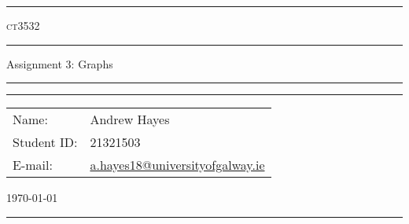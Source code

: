 \documentclass[a4paper,11pt]{article}
\author{Andrew Hayes}
\begin{document}
\begin{titlepage}
    \begin{center}
        \hrule
        \vspace*{0.6cm}
        \Huge \textsc{ct3532}
        \vspace*{0.6cm}
        \hrule
        \LARGE
       \vspace{0.5cm}
       Assignment 3: Graphs
       \vspace{0.5cm}
       \hrule

       \footnotesize
       \vfill
            \centering
       \vfill

       \hrule
        \begin{minipage}{0.495\textwidth} 
            \vspace{0.4em}
            \raggedright
            \normalsize 
            \begin{tabular}{@{}l l}
                Name: & Andrew Hayes \\
                Student ID: & 21321503 \\
                E-mail: & \href{mailto://a.hayes18@universityofgalway.ie}{a.hayes18@universityofgalway.ie} \\
            \end{tabular}
        \end{minipage}
        \begin{minipage}{0.495\textwidth} 
            \raggedleft
            \vspace*{0.8cm}
            \Large
            \today
            \vspace*{0.6cm}
        \end{minipage}
        \medskip\hrule 
    \end{center}
\end{titlepage}
\end{document}
